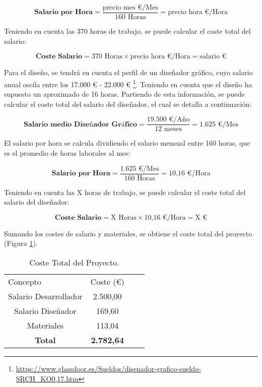 \begin{equation}
    \textbf{Salario por Hora} = \frac {\text{precio mes €/Mes}}{160 \text{ Horas}} = \text{precio hora €/Hora}
\end{equation}

Teniendo en cuenta las 370 horas de trabajo, se puede calcular el coste total del salario:

\begin{equation}
    \textbf{Coste Salario} = \text{370 Horas} \times \text{precio hora €/Hora} = \text{salario €}
\end{equation}

Para el diseño, se tendrá en cuenta el perfil de un diseñador gráfico, cuyo salario anual oscila entre los 17.000 € - 22.000 € \footnote{\url{https://www.glassdoor.es/Sueldos/disenador-grafico-sueldo-SRCH_KO0,17.htm}}. Teniendo en cuenta que el diseño ha supuesto un aproximado de 16 horas. Partiendo de esta información, se puede calcular el coste total del salario del diseñador, el cual se detalla a continuación:

\begin{equation}
    \textbf{Salario medio Diseñador Gráfico} =  \frac {\text{19.500 €/Año} }{ \text{12 meses}} = \text{1.625 €/Mes}
\end{equation}

El salario por hora se calcula dividiendo el salario mensual entre 160 horas, que es el promedio de horas laborales al mes:

\begin{equation}
    \textbf{Salario por Hora} = \frac {\text{1.625 €/Mes}}{160 \text{ Horas}} = \text{10,16 €/Hora}
\end{equation}

Teniendo en cuenta las X horas de trabajo, se puede calcular el coste total del salario del diseñador:

\begin{equation}
    \textbf{Coste Salario} = \text{X Horas} \times \text{10,16 €/Hora} = \text{X €}
\end{equation}

Sumando los costes de salario y materiales, se obtiene el coste total del proyecto (Figura \ref{tab:coste_total}).

\begin{table}[H]
    \centering
    \begin{tabular}{|c|c|ll}
    \cline{1-2}
    \multicolumn{1}{|l|}{Concepto} & \multicolumn{1}{l|}{Coste (€)} &  &  \\ \cline{1-2}
    Salario Desarrollador           & 2.500,00                        &  &  \\ \cline{1-2}
    Salario Diseñador               & 169,60                         &  &  \\ \cline{1-2}
    Materiales                      & 113,04                       &  &  \\ \cline{1-2}
    \textbf{Total}                   & \textbf{2.782,64}               &  &  \\ \cline{1-2}
    \end{tabular}
    \caption{Coste Total del Proyecto.}
    \label{tab:coste_total}
\end{table}

